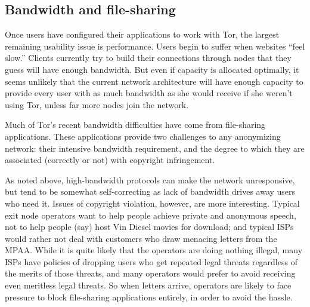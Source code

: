 \documentclass{llncs}
\begin{document}

\subsection{Bandwidth and file-sharing}
\label{subsec:bandwidth-and-file-sharing}
Once users have configured their applications to work with Tor, the largest
remaining usability issue is performance.  Users begin to suffer
when websites ``feel slow.''
Clients currently try to build their connections through nodes that they
guess will have enough bandwidth.  But even if capacity is allocated
optimally, it seems unlikely that the current network architecture will have
enough capacity to provide every user with as much bandwidth as she would
receive if she weren't using Tor, unless far more nodes join the network.


Much of Tor's recent bandwidth difficulties have come from file-sharing
applications.  These applications provide two challenges to
any anonymizing network: their intensive bandwidth requirement, and the
degree to which they are associated (correctly or not) with copyright
infringement.

As noted above, high-bandwidth protocols can make the network unresponsive,
but tend to be somewhat self-correcting as lack of bandwidth drives away
users who need it.  Issues of copyright violation,
however, are more interesting.  Typical exit node operators want to help
people achieve private and anonymous speech, not to help people (say) host
Vin Diesel movies for download; and typical ISPs would rather not
deal with customers who draw menacing letters
from the MPAA\@.  While it is quite likely that the operators are doing nothing
illegal, many ISPs have policies of dropping users who get repeated legal
threats regardless of the merits of those threats, and many operators would
prefer to avoid receiving even meritless legal threats.
So when letters arrive, operators are likely to face
pressure to block file-sharing applications entirely, in order to avoid the
hassle.
\end{document}
